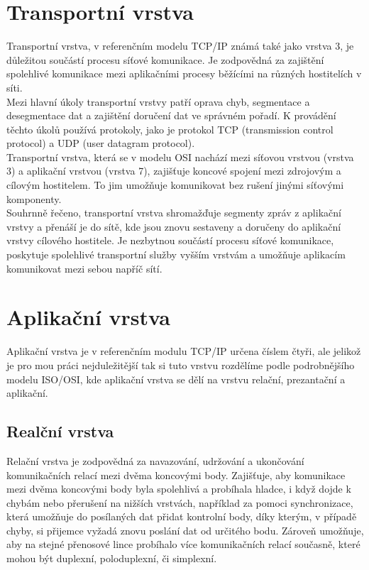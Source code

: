 \documentclass[12pt]{report}			%
\begin{document}
\cite{sit1}
 \cite{sit2}

			\section{Transportní vrstva}
Transportní vrstva, v referenčním modelu TCP/IP známá také jako vrstva 3, je důležitou součástí procesu síťové komunikace. Je zodpovědná za zajištění spolehlivé komunikace mezi aplikačními procesy běžícími na různých hostitelích v síti.
\\
Mezi hlavní úkoly transportní vrstvy patří oprava chyb, segmentace a desegmentace dat a zajištění doručení dat ve správném pořadí. K provádění těchto úkolů používá protokoly, jako je protokol TCP (transmission control protocol) a UDP (user datagram protocol).
\\
Transportní vrstva, která se v modelu OSI nachází mezi síťovou vrstvou (vrstva 3) a aplikační vrstvou (vrstva 7), zajišťuje koncové spojení mezi zdrojovým a cílovým hostitelem. To jim umožňuje komunikovat bez rušení jinými síťovými komponenty.
\\
Souhrnně řečeno, transportní vrstva shromažďuje segmenty zpráv z aplikační vrstvy a přenáší je do sítě, kde jsou znovu sestaveny a doručeny do aplikační vrstvy cílového hostitele. Je nezbytnou součástí procesu síťové komunikace, poskytuje spolehlivé transportní služby vyšším vrstvám a umožňuje aplikacím komunikovat mezi sebou napříč sítí.


\cite{tran1}
\cite{tran2}
\cite{tran3}
			\section{Aplikační  vrstva}
 Aplikační vrstva je v referenčním modulu TCP/IP určena číslem čtyři, ale jelikož je pro mou práci nejduležitější tak si tuto vrstvu rozdělíme podle podrobnějšího modelu ISO/OSI, kde aplikační vrstva se dělí na vrstvu relační, prezantační a aplikační. 
				\subsection{Realční vrstva}
Relační vrstva je zodpovědná za navazování, udržování a ukončování komunikačních relací mezi dvěma koncovými body. Zajišťuje, aby komunikace mezi dvěma koncovými body byla spolehlivá a probíhala hladce, i když dojde k chybám nebo přerušení na nižších vrstvách, například za pomoci synchronizace, která umožňuje do posílaných dat přidat kontrolní body, díky kterým, v případě chyby, si přijemce vyžadá znovu poslání dat od určitého bodu. Zároveň umožňuje, aby na stejné přenosové lince probíhalo více komunikačních relací současně, které mohou být duplexní, poloduplexní, či simplexní. 
\end{document}
